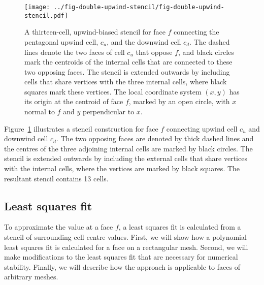 \begin{figure}
	\centering
	\texttt{[image: ../fig-double-upwind-stencil/fig-double-upwind-stencil.pdf]}
	\caption{A thirteen-cell, upwind-biased stencil for face $f$ connecting the pentagonal upwind cell, $c_u$, and the downwind cell $c_d$.  The dashed lines denote the two faces of cell $c_u$ that oppose $f$, and black circles mark the centroids of the internal cells that are connected to these two opposing faces.  The stencil is extended outwards by including cells that share vertices with the three internal cells, where black squares mark these vertices.  The local coordinate system $(x, y)$ has its origin at the centroid of face $f$, marked by an open circle, with $x$ normal to $f$ and $y$ perpendicular to $x$.}
	\label{fig:double-upwind-stencil}
\end{figure}

Figure~\ref{fig:double-upwind-stencil} illustrates a stencil construction for face $f$ connecting upwind cell $c_u$ and downwind cell $c_d$.  The two opposing faces are denoted by thick dashed lines and the centres of the three adjoining internal cells are marked by black circles.  The stencil is extended outwards by including the external cells that share vertices with the internal cells, where the vertices are marked by black squares.  The resultant stencil contains 13 cells.


\subsection{Least squares fit}
To approximate the value at a face $f$, a least squares fit is calculated from a stencil of surrounding cell centre values.  First, we will show how a polynomial least squares fit is calculated for a face on a rectangular mesh.  Second, we will make modifications to the least squares fit that are necessary for numerical stability.  Finally, we will describe how the approach is applicable to faces of arbitrary meshes.  

